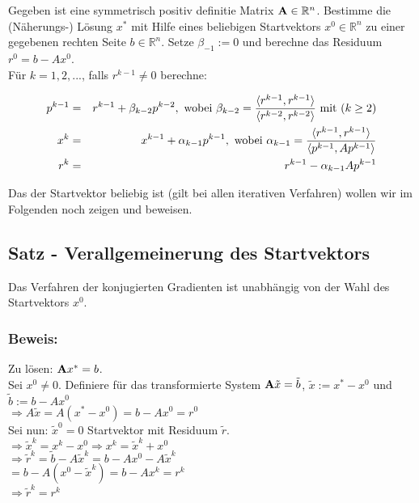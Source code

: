 Gegeben ist eine symmetrisch positiv definitie Matrix ${\textbf{A}} \in \mathbb{R}^{n}$. Bestimme die (Näherungs-) Lösung $x^{*}$ mit Hilfe eines beliebigen Startvektors $x^{0} \in \mathbb{R}^{n}$ zu einer gegebenen rechten Seite $b \in \mathbb{R}^{n}$. Setze $\beta_{-1} := 0$ und berechne das Residuum $r^{0} = b - Ax^{0}$. \\
Für $k = 1,2,...$, falls $r^{k-1} \ne 0$ berechne:

\begin{eqnarray}
p^{k-1} &=& r^{k-1} + \beta_{k-2}p^{k-2}, \textnormal{ wobei } \beta_{k-2} = \frac {\langle r^{k-1}, r^{k-1} \rangle} {\langle r^{k-2}, r^{k-2} \rangle} \textnormal{ mit } (k \ge 2) \notag \\
x^{k} &=& x^{k-1} + \alpha_{k-1}p^{k-1}, \textnormal{ wobei } \alpha_{k-1} = \frac {\langle r^{k-1}, r^{k-1} \rangle} {\langle p^{k-1}, Ap^{k-1} \rangle} \notag \\
r^{k} &=& r^{k-1} - \alpha_{k-1}Ap^{k-1} \notag
\end{eqnarray}

Das der Startvektor beliebig ist (gilt bei allen iterativen Verfahren) wollen wir im Folgenden noch zeigen und beweisen.

\subsection{Satz - Verallgemeinerung des Startvektors}

Das Verfahren der konjugierten Gradienten ist unabhängig von der Wahl des Startvektors $x^{0}$.

\subsubsection{Beweis:}
Zu lösen: ${\textbf{A}}x^{*} = b$.
\\Sei $x^{0} \ne 0$. Definiere für das transformierte System ${\textbf{A}}\tilde x = \tilde b$, $\tilde x := x^{*} - x^{0}$ und $\tilde b := b - Ax^{0}$
\\$\Longrightarrow A\tilde x = A(x^{*} - x^{0}) = b - Ax^{0} = r^{0}$
\\Sei nun: $\tilde x^{0} = 0$ Startvektor mit Residuum $\tilde r$.
\\$\Longrightarrow \tilde x^{k} = x^{k} - x^{0} \Longrightarrow x^{k} = \tilde x^{k} + x^{0}$
\\$\Longrightarrow \tilde r^{k} = \tilde b - A\tilde x^{k} = b - Ax^{0} - A\tilde x^{k}$
\\$= b - A(x^{0} - \tilde x^{k}) = b - Ax^{k} = r^{k}$
\\$\Longrightarrow \tilde r^{k} = r^{k}$


